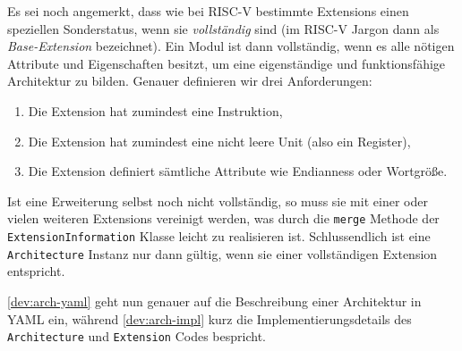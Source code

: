 Es sei noch angemerkt, dass wie bei RISC-V bestimmte Extensions einen speziellen
Sonderstatus, wenn sie \emph{vollständig} sind (im RISC-V Jargon dann als
\emph{Base-Extension} bezeichnet). Ein Modul ist dann vollständig, wenn es alle
nötigen Attribute und Eigenschaften besitzt, um eine eigenständige und
funktionsfähige Architektur zu bilden. Genauer definieren wir drei Anforderungen:
\begin{enumerate}
  \item Die Extension hat zumindest eine Instruktion,
  \item Die Extension hat zumindest eine nicht leere Unit (also ein Register),
  \item Die Extension definiert sämtliche Attribute wie Endianness oder Wortgröße.
\end{enumerate}

Ist eine Erweiterung selbst noch nicht vollständig, so muss sie mit einer oder
vielen weiteren Extensions vereinigt werden, was durch die \texttt{merge}
Methode der \texttt{ExtensionInformation} Klasse leicht zu realisieren ist.
Schlussendlich ist eine \texttt{Architecture} Instanz nur dann gültig, wenn sie
einer vollständigen Extension entspricht.

\autoref{dev:arch-yaml} geht nun genauer auf die Beschreibung einer Architektur
in YAML ein, während \autoref{dev:arch-impl} kurz die Implementierungsdetails
des \texttt{Architecture} und \texttt{Extension} Codes bespricht.


